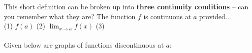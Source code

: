 \documentclass[10pt]{article}
\begin{document}
\bigskip

This short definition can be broken up into {\bf three continuity conditions} -- can you remember what they are? The function $f$ is continuous at $a$ provided...  \\
(1) $f(a)$   \hfill
%
(2) $\displaystyle\lim_{x\to a}f(x)$ \hfill
%
(3)  \\[0.3in]

{\bf {}}\\
{} Given below are graphs of functions discontinuous at $a$:\\
\end{document}
